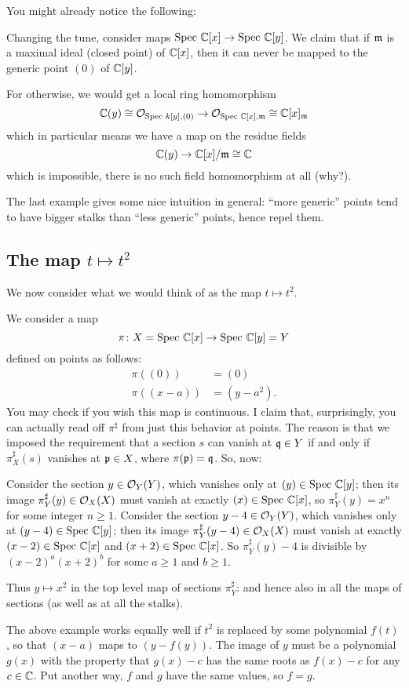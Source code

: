 You might already notice the following:
\begin{example}
	Changing the tune, consider maps $\text{Spec } \mathbb C[x] \to \text{Spec } \mathbb C[y]$.
	We claim that if $\mathfrak m$ is a maximal ideal (closed point)
	of $\mathbb C[x]$, then it can never be mapped to the generic point $(0)$ of $\mathbb C[y]$.

	For otherwise, we would get a local ring homomorphism
	\[ \mathbb C(y) \cong \mathcal O_{\text{Spec } k[y], (0)}
		\to \mathcal O_{\text{Spec } \mathbb C[x], \mathfrak m} \cong \mathbb C[x]_\mathfrak m \]
	which in particular means we have a map on the residue fields
	\[ \mathbb C(y) \to \mathbb C[x] / \mathfrak m \cong \mathbb C \]
	which is impossible, there is no such field homomorphism at all (why?).
\end{example}
The last example gives some nice intuition in general:
``more generic'' points tend to have bigger stalks
than ``less generic'' points, hence repel them.

\subsection{The map $t \mapsto t^2$}
We now consider what we would think
of as the map $t \mapsto t^2$.
\begin{example}
	We consider a map 
	\[ \pi \colon X = \text{Spec } \mathbb C[x] \to \text{Spec } \mathbb C[y] = Y \]
	defined on points as follows:
	\begin{align*}
		\pi\left( (0) \right) &= (0) \\
		\pi\left( (x-a)  \right) &= (y-a^2).
	\end{align*}
	You may check if you wish this map is continuous.
	I claim that, surprisingly,
	you can actually read off $\pi^\sharp$ from just this
	behavior at points.
	The reason is that we imposed the requirement
	that a section $s$ can vanish at $\mathfrak q \in Y$
	if and only if $\pi^\sharp_X(s)$ vanishes at $\mathfrak p \in X$,
	where $\pi(\mathfrak p) = \mathfrak q$.
	So, now:
	\begin{itemize}
		\ii Consider the section $y \in \mathcal O_Y(Y)$,
		which vanishes only at $(y) \in \text{Spec } \mathbb C[y]$;
		then its image $\pi^\sharp_Y(y) \in \mathcal O_X(X)$
		must vanish at exactly $(x) \in \text{Spec } \mathbb C[x]$,
		so $\pi^\sharp_Y(y) = x^n$ for some integer $n \ge 1$.
		\ii Consider the section $y-4 \in \mathcal O_Y(Y)$,
		which vanishes only at $(y-4) \in \text{Spec } \mathbb C[y]$;
		then its image $\pi^\sharp_Y(y-4) \in \mathcal O_X(X)$
		must vanish at exactly $(x-2) \in \text{Spec } \mathbb C[x]$
		and $(x+2) \in \text{Spec } \mathbb C[x]$.
		So $\pi^\sharp_Y(y)-4$ is divisible by $(x-2)^a(x+2)^b$
		for some $a \ge 1$ and $b \ge 1$.
	\end{itemize}
	Thus $y \mapsto x^2$ in the top level map of sections $\pi^\sharp_Y$:
	and hence also in all the maps of sections
	(as well as at all the stalks).
\end{example}
The above example works equally well if $t^2$ is replaced
by some polynomial $f(t)$,
so that $(x-a)$ maps to $(y-f(y))$.
The image of $y$ must be a polynomial $g(x)$
with the property that $g(x)-c$ has the same roots as $f(x)-c$
for any $c \in \mathbb C$.
Put another way, $f$ and $g$ have the same values, so $f = g$.

